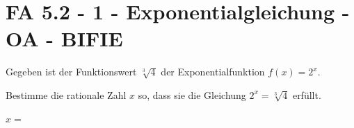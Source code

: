 \section{FA 5.2 - 1 - Exponentialgleichung - OA - BIFIE}

\begin{beispiel}[FA 5.2]{1} %
Gegeben ist der Funktionswert $\sqrt[3]{4}$ der Exponentialfunktion $f(x) = 2^x$.
 \leer

Bestimme die rationale Zahl $x$ so, dass sie die Gleichung $2^x = \sqrt[3]{4}$ erfüllt.

\leer

$x=$\,
\end{beispiel}